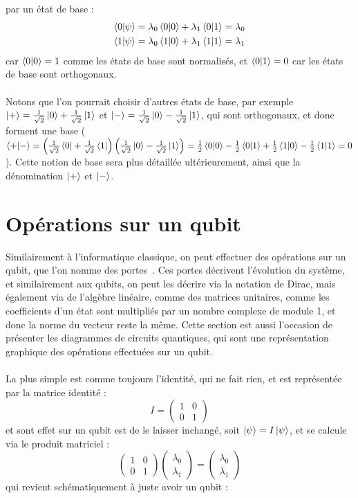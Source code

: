 par un état de base :
\begin{gather*}
    \bra{0}\ket{\psi} = \lambda_0 \bra{0}\ket{0} + \lambda_1 \bra{0}\ket{1} = \lambda_0\\
    \bra{1}\ket{\psi} = \lambda_0 \bra{1}\ket{0} + \lambda_1 \bra{1}\ket{1} = \lambda_1
\end{gather*}
car $\bra{0}\ket{0} = 1$ comme les états de base sont normalisés, et $\bra{0}\ket{1} = 0$ car les états de base sont
orthogonaux.\\ \\
Notons que l'on pourrait choisir d'autres états de base, par exemple $\ket{+} = \frac{1}{\sqrt{2}} \ket{0} +
\frac{1}{\sqrt{2}} \ket{1}$ et $\ket{-} = \frac{1}{\sqrt{2}} \ket{0} - \frac{1}{\sqrt{2}} \ket{1}$, qui sont
orthogonaux, et donc forment une base ($\bra{+}\ket{-} = \left(\frac{1}{\sqrt{2}} \bra{0} + \frac{1}{\sqrt{2}} \bra{1}\right)
\left(\frac{1}{\sqrt{2}} \ket{0} - \frac{1}{\sqrt{2}} \ket{1}\right) = \frac{1}{2} \bra{0}\ket{0} - \frac{1}{2} \bra{0}\ket{1} +
\frac{1}{2} \bra{1}\ket{0} - \frac{1}{2} \bra{1}\ket{1} = 0$).
Cette notion de base sera plus détaillée ultérieurement, ainsi que la dénomination $\ket{+}$ et $\ket{-}$.

\section{Opérations sur un qubit}\label{sec:operations-sur-un-qubit}

Similairement à l'informatique classique, on peut effectuer des opérations sur un qubit, que l'on nomme des portes~\cite{wiki:qantum-gates}.
Ces portes décrivent l'évolution du système, et similairement aux qubits, on peut les décrire via la notation de Dirac,
mais également via de l'algèbre linéaire, comme des matrices unitaires, comme les coefficients d'un état sont
multipliés par un nombre complexe de module 1, et donc la norme du vecteur reste la même.
Cette section est aussi l'occasion de présenter les diagrammes de circuits quantiques, qui sont une représentation
graphique des opérations effectuées sur un qubit.\\ \\
La plus simple est comme toujours l'identité, qui ne fait rien, et est représentée par la matrice identité :
\[
    I = \begin{pmatrix} 1 & 0 \\ 0 & 1 \end{pmatrix}
\]
et sont effet sur un qubit est de le laisser inchangé, soit $\ket{\psi} = I \ket{\psi}$, et se calcule via le produit matriciel :
\[
    \begin{pmatrix} 1 & 0 \\ 0 & 1 \end{pmatrix} \begin{pmatrix} \lambda_0 \\ \lambda_1 \end{pmatrix} =
    \begin{pmatrix} \lambda_0 \\ \lambda_1 \end{pmatrix}
\]
qui revient schématiquement à juste avoir un qubit :

